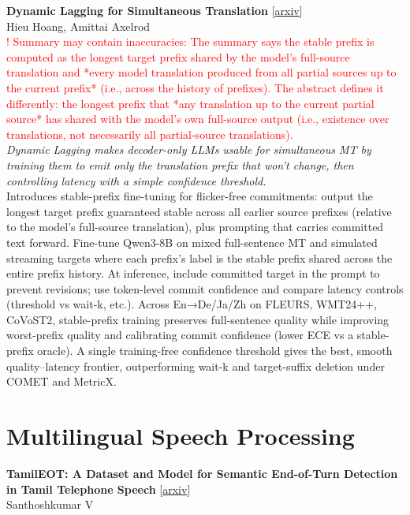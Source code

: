 \documentclass[12pt,letterpaper]{article}
\begin{document}
\medskip

{\small\textbf{Dynamic Lagging for Simultaneous Translation}} {\scriptsize[\href{https://arxiv.org/abs/2609.05799}{arxiv}]}\\
{\scriptsize Hieu Hoang, Amittai Axelrod}\\

{\scriptsize\textcolor{red}{! Summary may contain inaccuracies: The summary says the stable prefix is computed as the longest target prefix shared by the model's full-source translation and *every model translation produced from all partial sources up to the current prefix* (i.e., across the history of prefixes). The abstract defines it differently: the longest prefix that *any translation up to the current partial source* has shared with the model's own full-source output (i.e., existence over translations, not necessarily all partial-source translations).}}\\[1pt]

{\small\textit{Dynamic Lagging makes decoder-only LLMs usable for simultaneous MT by training them to emit only the translation prefix that won't change, then controlling latency with a simple confidence threshold.}}\\[1pt]
{\footnotesize Introduces stable-prefix fine-tuning for flicker-free commitments: output the longest target prefix guaranteed stable across all earlier source prefixes (relative to the model's full-source translation), plus prompting that carries committed text forward. Fine-tune Qwen3-8B on mixed full-sentence MT and simulated streaming targets where each prefix's label is the stable prefix shared across the entire prefix history. At inference, include committed target in the prompt to prevent revisions; use token-level commit confidence and compare latency controls (threshold vs wait-k, etc.). Across En→De/Ja/Zh on FLEURS, WMT24++, CoVoST2, stable-prefix training preserves full-sentence quality while improving worst-prefix quality and calibrating commit confidence (lower ECE vs a stable-prefix oracle). A single training-free confidence threshold gives the best, smooth quality--latency frontier, outperforming wait-k and target-suffix deletion under COMET and MetricX.}

\medskip


\section*{Multilingual Speech Processing}

{\small\textbf{TamilEOT: A Dataset and Model for Semantic End-of-Turn Detection in Tamil Telephone Speech}} {\scriptsize[\href{https://arxiv.org/abs/2609.05631}{arxiv}]}\\
{\scriptsize Santhoshkumar V}\\
\end{document}
